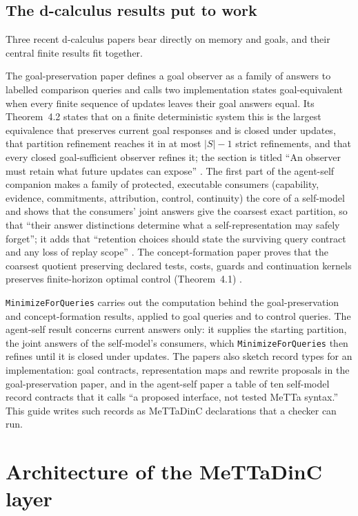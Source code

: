 \documentclass[11pt]{article}
\newcommand{\code}[1]{\texttt{#1}}
\theoremstyle{definition}
\theoremstyle{plain}
\begin{document}
\subsection{The d-calculus results put to work}\label{sec:dcalc}

Three recent d-calculus papers bear directly on memory and goals, and their central finite
results fit together.

The goal-preservation paper defines a goal observer as a family of answers to labelled comparison
queries and calls two implementation states goal-equivalent when every finite sequence of updates
leaves their goal answers equal. Its Theorem~4.2 states that on a finite deterministic system this
is the largest equivalence that preserves current goal responses and is closed under updates, that
partition refinement reaches it in at most $|S|-1$ strict refinements, and that every closed
goal-sufficient observer refines it; the section is titled ``An observer must retain what future
updates can expose'' \cite{goalpres}. The first part of the agent-self companion makes a family of
protected, executable consumers (capability, evidence, commitments, attribution, control,
continuity) the core of a self-model and shows that the consumers' joint answers give the coarsest
exact partition, so that ``their answer distinctions determine what a self-representation may
safely forget''; it adds that ``retention choices should state the surviving query contract and any
loss of replay scope'' \cite{self1}. The concept-formation paper proves that the coarsest
quotient preserving declared tests, costs, guards and continuation kernels preserves
finite-horizon optimal control (Theorem~4.1) \cite{concept}.

\code{MinimizeForQueries} carries out the computation behind the goal-preservation and
concept-formation results, applied to goal queries and to control queries. The agent-self result
concerns current answers only: it supplies the starting partition, the joint answers of the
self-model's consumers, which \code{MinimizeForQueries} then refines until it is closed under
updates. The papers also sketch record types for an implementation: goal contracts,
representation maps and rewrite proposals in the goal-preservation paper, and in the agent-self
paper a table of ten self-model record contracts that it calls ``a proposed interface, not tested
MeTTa syntax.'' This guide writes such
records as MeTTaDinC declarations that a checker can run.

\section{Architecture of the MeTTaDinC layer}\label{sec:arch}
\end{document}
